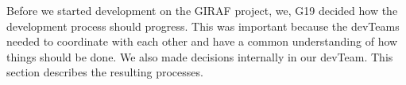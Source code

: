 Before we started development on the GIRAF project, we,  \gls{G19} decided how the development process should progress.
This was important because the \glspl{devTeam} needed to coordinate with each other and have a common understanding of how things should be done.
We also made decisions internally in our \gls{devTeam}. 
This section describes the resulting processes. 